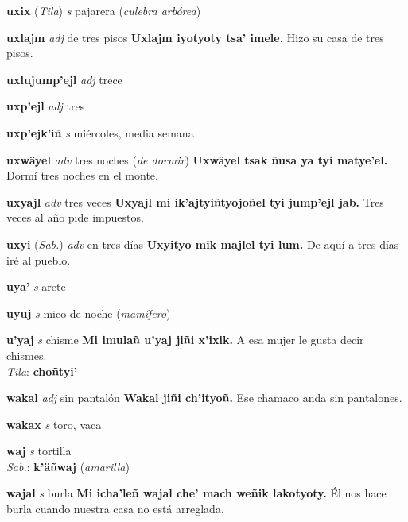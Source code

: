 \documentclass[10pt]{scrbook}
\newcommand{\entry}[1]{\textbf{#1}}
\newcommand{\alphaletter}[1]{\end{multicols}\addsec{#1}\begin{multicols}{2}}
\newcommand{\partofspeech}[1]{\textit{#1}}
\newcommand{\spanishtranslation}[1]{#1}
\newcommand{\clarification}[1]{(\textit{#1})}
\newcommand{\cholexample}[1]{\textbf{#1}}
\newcommand{\exampletranslation}[1]{#1}
\newcommand{\dialectvariant}[1]{\\\textit{#1}:}
\newcommand{\dialectword}[1]{\textbf{#1}}
\newcommand{\relevantdialect}[1]{(\textit{#1})}
\begin{document}
\begin{multicols}{2}
\entry{uxix}
\relevantdialect{Tila}
\partofspeech{s}
\spanishtranslation{pajarera}
\clarification{culebra arbórea}

\entry{uxlajm}
\partofspeech{adj}
\spanishtranslation{de tres pisos}
\cholexample{Uxlajm iyotyoty tsa' imele.}
\exampletranslation{Hizo su casa de tres pisos.}

\entry{uxlujump'ejl}
\partofspeech{adj}
\spanishtranslation{trece}

\entry{uxp'ejl}
\partofspeech{adj}
\spanishtranslation{tres}

\entry{uxp'ejk'iñ}
\partofspeech{s}
\spanishtranslation{miércoles, media semana}

\entry{uxwäyel}
\partofspeech{adv}
\spanishtranslation{tres noches}
\clarification{de dormir}
\cholexample{Uxwäyel tsak ñusa ya tyi matye'el.}
\exampletranslation{Dormí tres noches en el monte.}

\entry{uxyajl}
\partofspeech{adv}
\spanishtranslation{tres veces}
\cholexample{Uxyajl mi ik'ajtyiñtyojoñel tyi jump'ejl jab.}
\exampletranslation{Tres veces al año pide impuestos.}

\entry{uxyi}
\relevantdialect{Sab.}
\partofspeech{adv}
\spanishtranslation{en tres días}
\cholexample{Uxyityo mik majlel tyi lum.}
\exampletranslation{De aquí a tres días iré al pueblo.}

\entry{uya'}
\partofspeech{s}
\spanishtranslation{arete}

\entry{uyuj}
\partofspeech{s}
\spanishtranslation{mico de noche}
\clarification{mamífero}

\entry{u'yaj}
\partofspeech{s}
\spanishtranslation{chisme}
\cholexample{Mi imulañ u'yaj jiñi x'ixik.}
\exampletranslation{A esa mujer le gusta decir chismes.}
\dialectvariant{Tila}
\dialectword{choñtyi'}

\alphaletter{W}

\entry{wakal}
\partofspeech{adj}
\spanishtranslation{sin pantalón}
\cholexample{Wakal jiñi ch'ityoñ.}
\exampletranslation{Ese chamaco anda sin pantalones.}

\entry{wakax}
\partofspeech{s}
\spanishtranslation{toro, vaca}

\entry{waj}
\partofspeech{s}
\spanishtranslation{tortilla}
\dialectvariant{Sab.}
\dialectword{k'äñwaj}
\clarification{amarilla}

\entry{wajal}
\partofspeech{s}
\spanishtranslation{burla}
\cholexample{Mi icha'leñ wajal che' mach weñik lakotyoty.}
\exampletranslation{Él nos hace burla cuando nuestra casa no está arreglada.}


\end{multicols}
\end{document}
